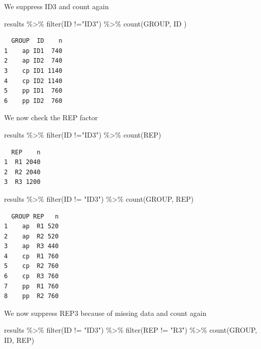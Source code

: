 \documentclass[
  letterpaper,
  DIV=11,
  numbers=noendperiod]{scrartcl}
\newenvironment{Shaded}{\begin{snugshade}}{\end{snugshade}}
\newcommand{\FunctionTok}[1]{\textcolor[rgb]{0.28,0.35,0.67}{#1}}
\newcommand{\NormalTok}[1]{\textcolor[rgb]{0.00,0.23,0.31}{#1}}
\newcommand{\SpecialCharTok}[1]{\textcolor[rgb]{0.37,0.37,0.37}{#1}}
\newcommand{\StringTok}[1]{\textcolor[rgb]{0.13,0.47,0.30}{#1}}
\begin{document}
We suppress ID3 and count again

\begin{Shaded}
\begin{Highlighting}[]
\NormalTok{results }\SpecialCharTok{\%\textgreater{}\%}
  \FunctionTok{filter}\NormalTok{(ID }\SpecialCharTok{!=}\StringTok{"ID3"}\NormalTok{) }\SpecialCharTok{\%\textgreater{}\%}
  \FunctionTok{count}\NormalTok{(GROUP, ID ) }
\end{Highlighting}
\end{Shaded}

\begin{verbatim}
  GROUP  ID    n
1    ap ID1  740
2    ap ID2  740
3    cp ID1 1140
4    cp ID2 1140
5    pp ID1  760
6    pp ID2  760
\end{verbatim}

We now check the REP factor

\begin{Shaded}
\begin{Highlighting}[]
\NormalTok{results }\SpecialCharTok{\%\textgreater{}\%}
  \FunctionTok{filter}\NormalTok{(ID }\SpecialCharTok{!=}\StringTok{"ID3"}\NormalTok{) }\SpecialCharTok{\%\textgreater{}\%}
  \FunctionTok{count}\NormalTok{(REP)}
\end{Highlighting}
\end{Shaded}

\begin{verbatim}
  REP    n
1  R1 2040
2  R2 2040
3  R3 1200
\end{verbatim}

\begin{Shaded}
\begin{Highlighting}[]
\NormalTok{results }\SpecialCharTok{\%\textgreater{}\%}
  \FunctionTok{filter}\NormalTok{(ID }\SpecialCharTok{!=} \StringTok{"ID3"}\NormalTok{) }\SpecialCharTok{\%\textgreater{}\%}
  \FunctionTok{count}\NormalTok{(GROUP, REP)}
\end{Highlighting}
\end{Shaded}

\begin{verbatim}
  GROUP REP   n
1    ap  R1 520
2    ap  R2 520
3    ap  R3 440
4    cp  R1 760
5    cp  R2 760
6    cp  R3 760
7    pp  R1 760
8    pp  R2 760
\end{verbatim}

We now suppress REP3 because of missing data and count again

\begin{Shaded}
\begin{Highlighting}[]
\NormalTok{results }\SpecialCharTok{\%\textgreater{}\%}
  \FunctionTok{filter}\NormalTok{(ID }\SpecialCharTok{!=} \StringTok{"ID3"}\NormalTok{) }\SpecialCharTok{\%\textgreater{}\%}
  \FunctionTok{filter}\NormalTok{(REP }\SpecialCharTok{!=} \StringTok{"R3"}\NormalTok{) }\SpecialCharTok{\%\textgreater{}\%}
  \FunctionTok{count}\NormalTok{(GROUP, ID, REP)  }
\end{Highlighting}
\end{Shaded}
\end{document}
